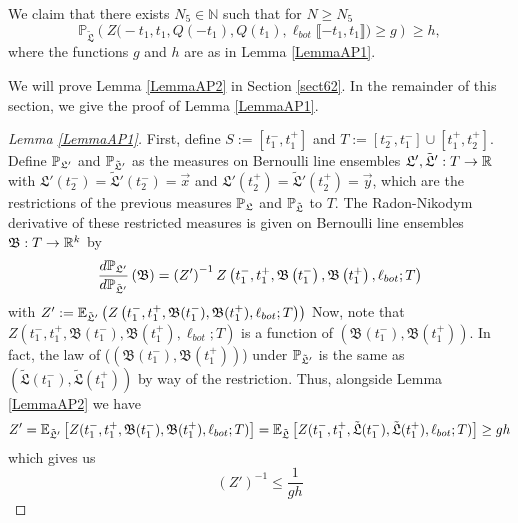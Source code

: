 \begin{lemma}\label{LemmaAP2} We claim that there exists $N_5 \in \mathbb{N}$ such that for $N \geq N_5$ 
	\begin{equation}\label{eqn57}
	\mathbb{P}_{\tilde{\mathfrak{L}}} \left( Z\big(  -t_1, t_1, Q(-t_1) ,Q(t_1), \ell_{bot}\llbracket -t_1, t_1\rrbracket\big)\geq g    \right) \geq h,
	\end{equation}
	where the functions $g$ and $h$ are as in Lemma \ref{LemmaAP1}.
\end{lemma}
We will prove Lemma \ref{LemmaAP2} in Section \ref{sect62}. In the remainder of this section, we give the proof of Lemma \ref{LemmaAP1}.
\begin{proof}[Lemma \ref{LemmaAP1}]
	
	First, define $S:=[t_1^-, t_1^+]$ and $T:=[t_2^-, t_1^-]\cup [t_1^+,t_2^+]$. Define $\mathbb{P}_{\mathfrak L'}$ and $\mathbb{P}_{\tilde{\mathfrak{L}}'}$ as the measures on Bernoulli line ensembles $\mathfrak L', \tilde{\mathfrak{L}}': T\to \mathbb{R}$ with $\mathfrak L'(t_2^-)=\tilde{\mathfrak{L}}'(t_2^-)=\vec x$ and $\mathfrak L'(t_2^+)=\tilde{\mathfrak{L}}'(t_2^+)=\vec y$, which are the restrictions of the previous measures $\mathbb{P}_{\mathfrak L}$ and $\mathbb{P}_{\tilde{\mathfrak{L}}}$ to $T$. The Radon-Nikodym derivative of these restricted measures is given on Bernoulli line ensembles $\mathfrak B: T\to \mathbb{R}^k$ by \begin{equation}\label{propRadon}\frac{d\mathbb{P}_{\mathfrak L'}}{d\mathbb{P}_{\tilde{\mathfrak L}'}}\left(\mathfrak B\right)=\left(Z'\right)^{-1}Z\left(t_1^-,t_1^+,\mathfrak{B}\left(t_1^-\right),\mathfrak{B}\left(t_1^+\right),\ell_{bot};T\right)
	\end{equation}
	with $Z':=\mathbb{E}_{\tilde{\mathfrak{L}}'}\left(Z\left(t_1^-, t_1^+, \mathfrak B(t_1^-), \mathfrak B(t_1^+), \ell_{bot}; T\right)\right)$ Now, note that $Z\left(t_1^-, t_1^+, \mathfrak B(t_1^-), \mathfrak B(t_1^+), \ell_{bot}; T\right)$ is a function of $(\mathfrak B(t_1^-), \mathfrak B(t_1^+))$. In fact, the law of ($\left(\mathfrak B(t_1^-), \mathfrak B(t_1^+)\right)$) under $\mathbb{P}_{\tilde{\mathfrak L}'}$ is the same as $(\tilde{\mathfrak L}(t_1^-), \tilde{\mathfrak L}(t_1^+))$ by way of the restriction. Thus, alongside Lemma \ref{LemmaAP2} we have
	\[
	Z'=\mathbb{E}_{\tilde{\mathfrak{L}}'}\left[Z(t_1^-, t_1^+, \mathfrak B(t_1^-),\mathfrak B(t_1^+),\ell_{bot};T)\right]=\mathbb{E}_{\tilde{\mathfrak{L}}}\left[Z(t_1^-, t_1^+, \tilde{\mathfrak L}(t_1^-),\tilde{\mathfrak L}(t_1^+),\ell_{bot};T)\right]\geq gh
	\]
	which gives us 
	\begin{equation}
	\label{Zineq} \left(Z'\right)^{-1}\leq \frac{1}{gh}
	\end{equation}
	

\end{proof}
